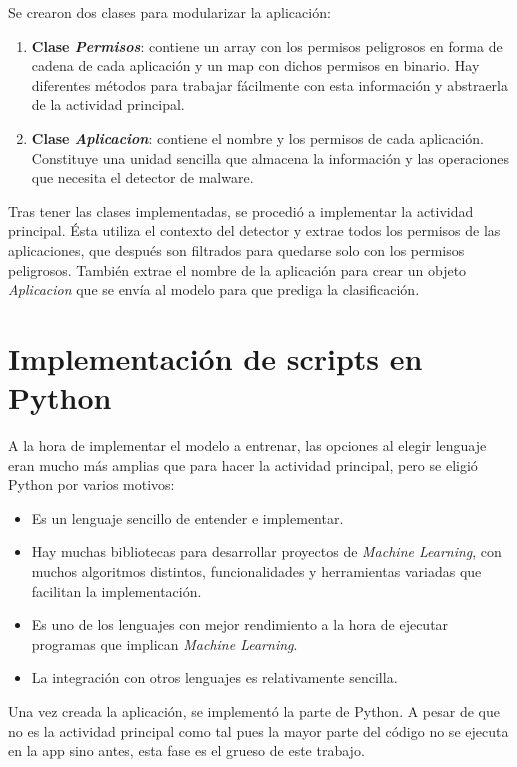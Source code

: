 Se crearon dos clases para modularizar la aplicación:

\begin{enumerate}
	\item \textbf{Clase \textit{Permisos}}: contiene un array con los permisos peligrosos en forma de cadena de cada aplicación y un map con dichos permisos en binario. Hay diferentes métodos para trabajar fácilmente con esta información y abstraerla de la actividad principal.
	\item \textbf{Clase \textit{Aplicacion}}: contiene el nombre y los permisos de cada aplicación. Constituye una unidad sencilla que almacena la información y las operaciones que necesita el detector de malware.
\end{enumerate}

Tras tener las clases implementadas, se procedió a implementar la actividad principal. Ésta utiliza el contexto del detector y extrae todos los permisos de las aplicaciones, que después son filtrados para quedarse solo con los permisos peligrosos. También extrae el nombre de la aplicación para crear un objeto \textit{Aplicacion} que se envía al modelo para que prediga la clasificación.

\section{Implementación de scripts en Python}

A la hora de implementar el modelo a entrenar, las opciones al elegir lenguaje eran mucho más amplias que para hacer la actividad principal, pero se eligió Python por varios motivos:

\begin{itemize}
	\item Es un lenguaje sencillo de entender e implementar.
	\item Hay muchas bibliotecas para desarrollar proyectos de \textit{Machine Learning}, con muchos algoritmos distintos, funcionalidades y herramientas variadas que facilitan la implementación.
	\item Es uno de los  lenguajes con mejor rendimiento a la hora de ejecutar programas que implican \textit{Machine Learning}.
	\item La integración con otros lenguajes es relativamente sencilla.
\end{itemize}

Una vez creada la aplicación, se implementó la parte de Python. A pesar de que no es la actividad principal como tal pues la mayor parte del código no se ejecuta en la app sino antes, esta fase es el grueso de este trabajo.


